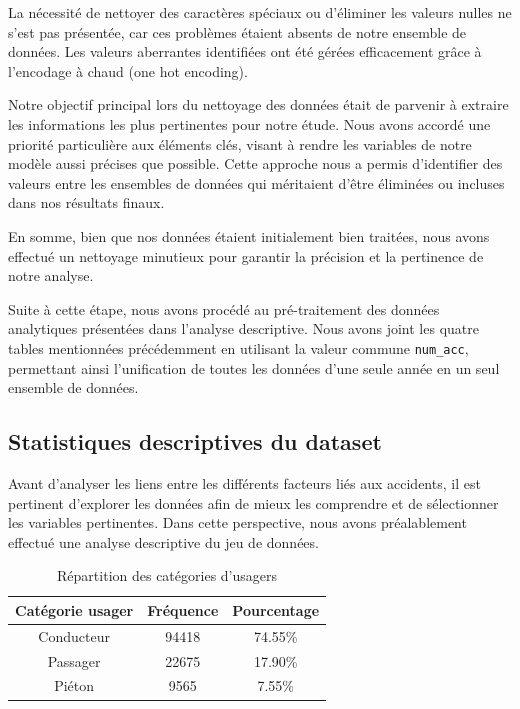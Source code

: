 \documentclass[french]{article}
\begin{document}
La nécessité de nettoyer des caractères spéciaux ou d’éliminer les valeurs nulles ne s'est pas présentée, car ces problèmes étaient absents de notre ensemble de données. Les valeurs aberrantes identifiées ont été gérées efficacement grâce à l’encodage à chaud (one hot encoding).

Notre objectif principal lors du nettoyage des données était de parvenir à extraire les informations les plus pertinentes pour notre étude. Nous avons accordé une priorité particulière aux éléments clés, visant à rendre les variables de notre modèle aussi précises que possible. Cette approche nous a permis d’identifier des valeurs entre les ensembles de données qui méritaient d'être éliminées ou incluses dans nos résultats finaux.

En somme, bien que nos données étaient initialement bien traitées, nous avons effectué un nettoyage minutieux pour garantir la précision et la pertinence de notre analyse.

Suite à cette étape, nous avons procédé au pré-traitement des données analytiques présentées dans l’analyse descriptive. Nous avons joint les quatre tables mentionnées précédemment en utilisant la valeur commune \verb|num_acc|, permettant ainsi l’unification de toutes les données d’une seule année en un seul ensemble de données.

\subsection{Statistiques descriptives du dataset}
Avant d’analyser les liens entre les différents facteurs liés aux accidents, il est pertinent d’explorer les données afin de mieux les comprendre et de sélectionner les variables pertinentes. Dans cette perspective, nous avons préalablement effectué une analyse descriptive du jeu de données.
\begin{table}[h]
\centering
\begin{tabular}{|c|c|c|}
\hline
\textbf{Catégorie usager} & \textbf{Fréquence} & \textbf{Pourcentage} \\
\hline
Conducteur & 94418 & 74.55\% \\
Passager & 22675 & 17.90\% \\
Piéton & 9565 & 7.55\% \\
\hline
\end{tabular}
\caption{Répartition des catégories d'usagers}
\end{table}
\end{document}
